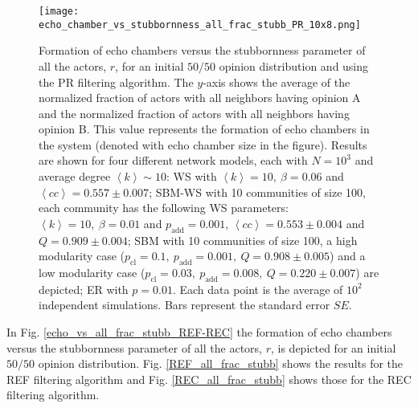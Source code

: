 \documentclass[11 pt , letterpaper , twoside , openright]{book}
\begin{document}
\begin{figure}[H]
	\texttt{[image: echo\_chamber\_vs\_stubbornness\_all\_frac\_stubb\_PR\_10x8.png]}
	\captionsetup{format=plain}
	\caption[Formation of echo chambers versus the stubbornness parameter of all the actors, $r$, for the PR filtering algorithm and an initial $50/50$ opinion distribution.]{Formation of echo chambers versus the stubbornness parameter of all the actors, $r$, for an initial $50/50$ opinion distribution and using the PR filtering algorithm. The $y$-axis shows the average of the normalized fraction of actors with all neighbors having opinion A and the normalized fraction of actors with all neighbors having opinion B. This value represents the formation of echo chambers in the system (denoted with echo chamber size in the figure). Results are shown for four different network models, each with $N=10^3$ and average degree $\left<k\right> \sim 10$: WS with $\left<k\right> =10,\ \beta = 0.06$ and $\left<cc\right> = 0.557 \pm 0.007$; SBM-WS with 10 communities of size 100, each community has the following WS parameters: $\left<k\right> = 10,\ \beta = 0.01$ and $p_{\text{add}} = 0.001$, $\left<cc\right> = 0.553 \pm 0.004$ and $Q = 0.909 \pm 0.004$; SBM with 10 communities of size 100, a high modularity case ($p_{\text{cl}} = 0.1,\ p_{\text{add}} = 0.001,\ Q = 0.908 \pm 0.005$) and a low modularity case ($p_{\text{cl}} = 0.03,\ p_{\text{add}} = 0.008,\ Q = 0.220 \pm 0.007$) are depicted; ER with $p= 0.01$. Each data point is the average of $10^2$ independent simulations. Bars represent the standard error $SE$.}
\label{echo_vs_all_frac_stubb_PR}
\end{figure}
\noindent
In Fig. \ref{echo_vs_all_frac_stubb_REF-REC} the formation of echo chambers versus the stubbornness parameter of all the actors, $r$, is depicted for an initial $50/50$ opinion distribution. Fig. \ref{REF_all_frac_stubb} shows the results for the REF filtering algorithm and Fig. \ref{REC_all_frac_stubb} shows those for the REC filtering algorithm.
\newpage
\end{document}
